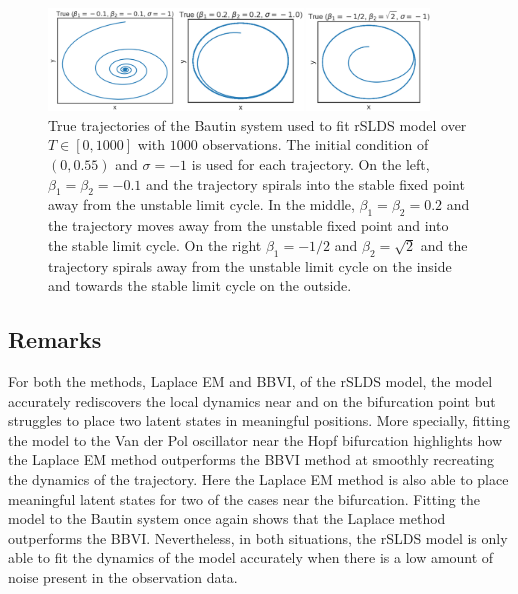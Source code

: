 \begin{figure}
    \centering
    \includegraphics[width=0.9\textwidth,height=\textwidth,keepaspectratio]{./Figures/bautin-true.png}
    \caption{True trajectories of the Bautin system used to fit rSLDS model over $T\in[0,1000]$ with $1000$ observations. The initial condition of $(0,0.55)$ and $\sigma = -1$ is used for each trajectory. On the left, $\beta_1 = \beta_2 = -0.1$ and the trajectory spirals into the stable fixed point away from the unstable limit cycle. In the middle, $\beta_1 = \beta_2 = 0.2$ and the trajectory moves away from the unstable fixed point and into the stable limit cycle. On the right $\beta_1 = -1/2$ and $\beta_2 = \sqrt{2}$ and the trajectory spirals away from the unstable limit cycle on the inside and towards the stable limit cycle on the outside. }
    \label{bautin-true}
\end{figure}


\subsection{Remarks}
For both the methods, Laplace EM and BBVI, of the rSLDS model, the model accurately rediscovers the local dynamics near and on the bifurcation point but struggles to place two latent states in meaningful positions. More specially, fitting the model to the Van der Pol oscillator near the Hopf bifurcation highlights how the Laplace EM method outperforms the BBVI method at smoothly recreating the dynamics of the trajectory. Here the Laplace EM method is also able to place meaningful latent states for two of the cases near the bifurcation. Fitting the model to the Bautin system once again shows that the Laplace method outperforms the BBVI. Nevertheless, in both situations, the rSLDS model is only able to fit the dynamics of the model accurately when there is a low amount of noise present in the observation data.

